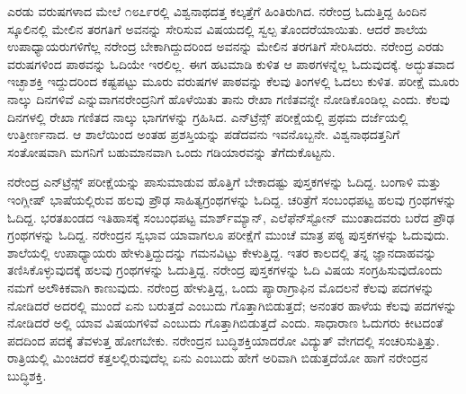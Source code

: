 ಎರಡು ವರುಷಗಳಾದ ಮೇಲೆ ೧೮೭೯ರಲ್ಲಿ ವಿಶ್ವನಾಥದತ್ತ ಕಲ್ಕತ್ತೆಗೆ ಹಿಂತಿರುಗಿದ. ನರೇಂದ್ರ ಓದುತ್ತಿದ್ದ ಹಿಂದಿನ ಸ್ಕೂಲಿನಲ್ಲಿ ಮೇಲಿನ ತರಗತಿಗೆ ಅವನನ್ನು ಸೇರಿಸುವ ವಿಷಯದಲ್ಲಿ ಸ್ವಲ್ಪ ತೊಂದರೆಯಾಯಿತು. ಆದರೆ ಶಾಲೆಯ ಉಪಾಧ್ಯಾಯರುಗಳಿಗೆಲ್ಲ ನರೇಂದ್ರ ಬೇಕಾಗಿದ್ದುದರಿಂದ ಅವನನ್ನು ಮೇಲಿನ ತರಗತಿಗೆ ಸೇರಿಸಿದರು. ನರೇಂದ್ರ ಎರಡು ವರುಷಗಳಿಂದ ಪಾಠವನ್ನು ಓದಿಯೇ ಇರಲಿಲ್ಲ. ಈಗ ಹಟಮಾಡಿ ಕುಳಿತ ಆ ಪಾಠಗಳನ್ನೆಲ್ಲ ಓದುವುದಕ್ಕೆ. ಅದ್ಭುತವಾದ ಇಚ್ಛಾಶಕ್ತಿ ಇದ್ದುದರಿಂದ ಕಷ್ಟಪಟ್ಟು ಮೂರು ವರುಷಗಳ ಪಾಠವನ್ನು ಕೆಲವು ತಿಂಗಳಲ್ಲಿ ಓದಲು ಕುಳಿತ. ಪರೀಕ್ಷೆ ಮೂರು ನಾಲ್ಕು ದಿನಗಳಿವೆ ಎನ್ನುವಾಗ\break ನರೇಂದ್ರನಿಗೆ ಹೊಳೆಯಿತು ತಾನು ರೇಖಾ ಗಣಿತವನ್ನೇ ನೋಡಿಕೊಂಡಿಲ್ಲ ಎಂದು. ಕೆಲವು ದಿನಗಳಲ್ಲಿ ರೇಖಾ ಗಣಿತದ ನಾಲ್ಕು ಭಾಗಗಳನ್ನು ಗ್ರಹಿಸಿದ. ಎನ್‍ಟ್ರೆನ್ಸ್ ಪರೀಕ್ಷೆಯಲ್ಲಿ ಪ್ರಥಮ ದರ್ಜೆಯಲ್ಲಿ ಉತ್ತೀರ್ಣನಾದ. ಆ ಶಾಲೆಯಿಂದ ಅಂತಹ ಪ್ರಶಸ್ತಿಯನ್ನು ಪಡೆದವನು ಇವನೊಬ್ಬನೇ. ವಿಶ್ವನಾಥದತ್ತನಿಗೆ ಸಂತೋಷವಾಗಿ ಮಗನಿಗೆ ಬಹುಮಾನವಾಗಿ ಒಂದು ಗಡಿಯಾರವನ್ನು ತೆಗೆದುಕೊಟ್ಟನು.

ನರೇಂದ್ರ ಎನ್‍ಟ್ರೆನ್ಸ್ ಪರೀಕ್ಷೆಯನ್ನು ಪಾಸುಮಾಡುವ ಹೊತ್ತಿಗೆ ಬೇಕಾದಷ್ಟು ಪುಸ್ತಕಗಳನ್ನು ಓದಿದ್ದ. ಬಂಗಾಳಿ ಮತ್ತು ಇಂಗ್ಲೀಷ್ ಭಾಷೆಯಲ್ಲಿರುವ ಹಲವು ಪ್ರೌಢ ಸಾಹಿತ್ಯಗ್ರಂಥಗಳನ್ನು ಓದಿದ್ದ. ಚರಿತ್ರೆಗೆ ಸಂಬಂಧಪಟ್ಟ ಹಲವು ಗ್ರಂಥಗಳನ್ನು ಓದಿದ್ದ. ಭರತಖಂಡದ ಇತಿಹಾಸಕ್ಕೆ ಸಂಬಂಧಪಟ್ಟ ಮಾರ್ಶ್‍ಮ್ಯಾನ್, ಎಲೆಫೆನ್‍ಸ್ಟೋನ್ ಮುಂತಾದವರು ಬರೆದ ಪ್ರೌಢ ಗ್ರಂಥಗಳನ್ನು ಓದಿದ್ದ. ನರೇಂದ್ರನ ಸ್ವಭಾವ ಯಾವಾಗಲೂ ಪರೀಕ್ಷೆಗೆ ಮುಂಚೆ ಮಾತ್ರ ಪಠ್ಯ ಪುಸ್ತಕಗಳನ್ನು ಓದುವುದು. ಶಾಲೆಯಲ್ಲಿ ಉಪಾಧ್ಯಾಯರು ಹೇಳುತ್ತಿದ್ದುದನ್ನು ಗಮನವಿಟ್ಟು ಕೇಳುತ್ತಿದ್ದ. ಇತರ ಕಾಲದಲ್ಲಿ ತನ್ನ ಜ್ಞಾನದಾಹವನ್ನು ತಣಿಸಿಕೊಳ್ಳುವುದಕ್ಕೆ ಹಲವು ಗ್ರಂಥಗಳನ್ನು ಓದುತ್ತಿದ್ದ. ನರೇಂದ್ರ ಪುಸ್ತಕಗಳನ್ನು ಓದಿ ವಿಷಯ ಸಂಗ್ರಹಿಸುವುದೊಂದು ನಮಗೆ ಅಲೌಕಿಕವಾಗಿ ಕಾಣುವುದು. ನರೇಂದ್ರ ಹೇಳುತ್ತಿದ್ದ, ಒಂದು ಪ್ಯಾರಾಗ್ರಾಫಿನ ಮೊದಲನೆ ಕೆಲವು ಪದಗಳನ್ನು ನೋಡಿದರೆ ಅದರಲ್ಲಿ ಮುಂದೆ ಏನು ಬರುತ್ತದೆ ಎಂಬುದು ಗೊತ್ತಾಗಿಬಿಡುತ್ತದೆ; ಅನಂತರ ಹಾಳೆಯ ಕೆಲವು ಪದಗಳನ್ನು ನೋಡಿದರೆ ಅಲ್ಲಿ ಯಾವ ವಿಷಯಗಳಿವೆ ಎಂಬುದು ಗೊತ್ತಾಗಿಬಿಡುತ್ತದೆ ಎಂದು. ಸಾಧಾರಾಣ ಓದುಗರು ಕೀಟದಂತೆ ಪದದಿಂದ ಪದಕ್ಕೆ ತೆವಳುತ್ತ ಹೋಗಬೇಕು. ನರೇಂದ್ರನ ಬುದ್ಧಿಶಕ್ತಿಯಾದರೋ ವಿದ್ಯುತ್ ವೇಗದಲ್ಲಿ ಸಂಚರಿಸುತ್ತಿತ್ತು. ರಾತ್ರಿಯಲ್ಲಿ ಮಿಂಚಿದರೆ ಕತ್ತಲಲ್ಲಿರುವುದೆಲ್ಲ ಏನು ಎಂಬುದು ಹೇಗೆ ಅರಿವಾಗಿ ಬಿಡುತ್ತದೆಯೋ ಹಾಗೆ ನರೇಂದ್ರನ ಬುದ್ಧಿಶಕ್ತಿ.

